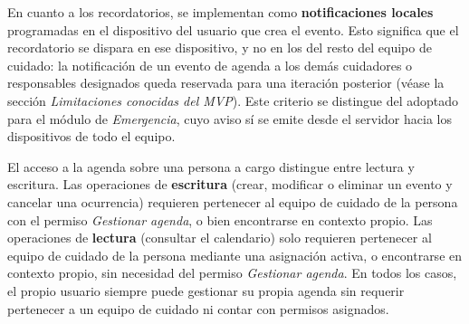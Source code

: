 \documentclass[a4paper,12pt]{article}
\begin{document}
    \par En cuanto a los recordatorios, se implementan como \textbf{notificaciones locales} programadas en el dispositivo del usuario que crea el evento. Esto significa que el recordatorio se dispara en ese dispositivo, y no en los del resto del equipo de cuidado: la notificación de un evento de agenda a los demás cuidadores o responsables designados queda reservada para una iteración posterior (véase la sección \textit{Limitaciones conocidas del MVP}). Este criterio se distingue del adoptado para el módulo de \textit{Emergencia}, cuyo aviso sí se emite desde el servidor hacia los dispositivos de todo el equipo.
    \par El acceso a la agenda sobre una persona a cargo distingue entre lectura y escritura. Las operaciones de \textbf{escritura} (crear, modificar o eliminar un evento y cancelar una ocurrencia) requieren pertenecer al equipo de cuidado de la persona con el permiso \textit{Gestionar agenda}, o bien encontrarse en contexto propio. Las operaciones de \textbf{lectura} (consultar el calendario) solo requieren pertenecer al equipo de cuidado de la persona mediante una asignación activa, o encontrarse en contexto propio, sin necesidad del permiso \textit{Gestionar agenda}. En todos los casos, el propio usuario siempre puede gestionar su propia agenda sin requerir pertenecer a un equipo de cuidado ni contar con permisos asignados.
\end{document}

